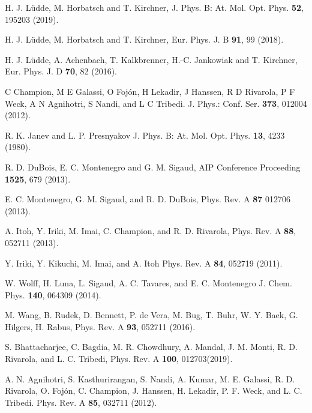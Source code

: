 \documentclass[10pt,showpacs,showkeys,twocolumn]{revtex4}
\begin{document}
\begin{thebibliography}{}
H. J. L\"udde,  M. Horbatsch and T. Kirchner, J. Phys. B: At. Mol. Opt. Phys.  \textbf{52}, 195203 (2019).

H. J. L\"udde, M. Horbatsch and T. Kirchner, Eur. Phys. J. B \textbf{91}, 99 (2018).

H. J. L\"udde, A. Achenbach, T. Kalkbrenner, H.-C. Jankowiak and T. Kirchner,
Eur. Phys. J. D \textbf{70}, 82 (2016).

C Champion, M E Galassi, O Foj\'{o}n, H Lekadir, J Hanssen, R D Rivarola, P F Weck, A N Agnihotri, S Nandi, and L C Tribedi. 
J. Phys.: Conf. Ser. \textbf{373}, 012004 (2012).


R. K. Janev and L. P. Presnyakov 
J. Phys. B: At. Mol. Opt. Phys.  \textbf{13}, 4233 (1980).

R. D. DuBois, E. C. Montenegro and G. M. Sigaud,
AIP Conference Proceeding \textbf{1525}, 679 (2013).

E. C. Montenegro, G. M. Sigaud, and R. D. DuBois, 
Phys. Rev. A \textbf{87} 012706 (2013).


A. Itoh, Y. Iriki, M. Imai, C. Champion, and R. D. Rivarola, 
Phys. Rev. A \textbf{88}, 052711 (2013).

Y. Iriki, Y. Kikuchi, M. Imai, and A. Itoh
Phys. Rev. A \textbf{84}, 052719 (2011). 


W. Wolff, H. Luna, L. Sigaud, A. C. Tavares, and E. C. Montenegro
J. Chem. Phys. \textbf{140}, 064309 (2014).

M. Wang, B. Rudek, D. Bennett, P. de Vera, M. Bug, T. Buhr, W. Y. Baek,
G. Hilgers, H. Rabus, 
Phys. Rev. A \textbf{93}, 052711 (2016).

S. Bhattacharjee, C. Bagdia, M. R. Chowdhury, A. Mandal, J. M. Monti, 
R. D. Rivarola, and L. C. Tribedi, 
Phys. Rev. A \textbf{100}, 012703(2019).

A. N. Agnihotri, S. Kasthurirangan, S. Nandi, A. Kumar, M. E. Galassi, 
R. D. Rivarola, O. Foj\'on, C. Champion, J. Hanssen, H. Lekadir, 
P. F. Weck, and L. C. Tribedi. 
Phys. Rev. A \textbf{85}, 032711 (2012).


\end{thebibliography}
\end{document}
